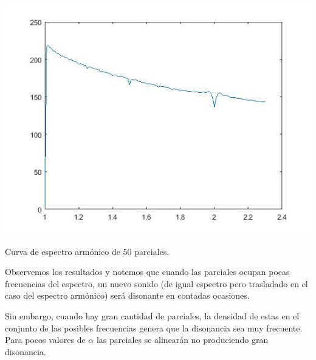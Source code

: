 \documentclass[11pt,a4paper]{article}
\begin{document}
	\begin{center}\includegraphics[scale=.5]{Espectro1_50.jpg}
	
	Curva de espectro armónico de 50 parciales.\end{center}
	
	
	\vspace{1cm}
	Observemos los resultados y notemos que cuando las parciales ocupan pocas frecuencias del espectro, un nuevo sonido (de igual espectro pero trasladado en el caso del espectro armónico) será disonante en contadas ocasiones.
	
	\noindent Sin embargo, cuando hay gran cantidad de parciales, la densidad de estas en el conjunto de las posibles frecuencias genera que la disonancia sea muy frecuente. Para pocos valores de $\alpha$ las parciales se alinearán no produciendo gran disonancia.
	
	
	
	
	
	
	
	
\end{document}
